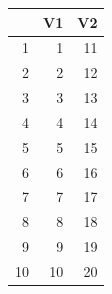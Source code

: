 \documentclass[twoside]{article}
\begin{document}
\lipsum[2]
\begin{table}[H]
\caption{IR (\%) at CFRR= 100\% (SD) [number of classes]}
\begin{table}[ht]
\centering
\begin{tabular}{rrr}
  \hline
 & V1 & V2 \\ 
  \hline
1 &   1 &  11 \\ 
  2 &   2 &  12 \\ 
  3 &   3 &  13 \\ 
  4 &   4 &  14 \\ 
  5 &   5 &  15 \\ 
  6 &   6 &  16 \\ 
  7 &   7 &  17 \\ 
  8 &   8 &  18 \\ 
  9 &   9 &  19 \\ 
  10 &  10 &  20 \\ 
   \hline
\end{tabular}
\end{table}
\end{table}


\end{document}

